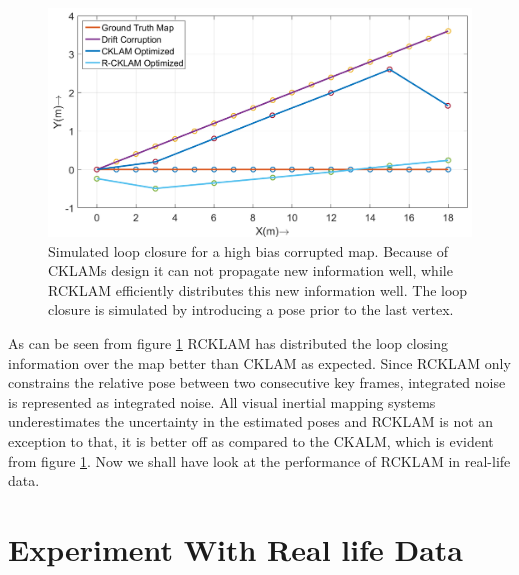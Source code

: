 \begin{figure}[ht]
  \centering
    \includegraphics[width=1.00\textwidth]{images/Syn16_map_loppClosureSym.png}
  \caption{Simulated loop closure for a high bias corrupted map. Because of CKLAMs design it can not propagate new information well, while RCKLAM efficiently distributes this new information well. The loop closure is simulated by introducing a pose prior to the last vertex.}
  \label{fig:Syn16MapLoppClosureSym}
\end{figure}

As can be seen from figure \ref{fig:Syn16MapLoppClosureSym} RCKLAM has distributed the loop closing information over the map better than CKLAM as expected. Since RCKLAM only constrains the relative pose between two consecutive key frames, integrated noise is represented as integrated noise. All visual inertial mapping systems underestimates the uncertainty in the estimated poses and RCKLAM is not an exception to that, it is better off as compared to the CKALM, which is evident from figure \ref{fig:Syn16MapLoppClosureSym}. Now we shall have look at the performance of RCKLAM in real-life data.

\section{Experiment With Real life Data}
\label{sec:RealLifeExpt}

